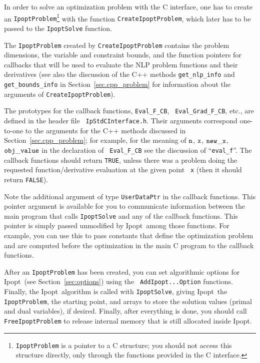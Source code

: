 \documentclass[10pt]{article}
\newcommand{\Ipopt}{{\sc Ipopt}}
\begin{document}
In order to solve an optimization problem with the C interface, one
has to create an {\tt IpoptProblem}\footnote{{\tt IpoptProblem} is a
  pointer to a C structure; you should not access this structure
  directly, only through the functions provided in the C interface.}
with the function {\tt CreateIpoptProblem}, which later has to be
passed to the {\tt IpoptSolve} function.

The {\tt IpoptProblem} created by {\tt CreateIpoptProblem} contains
the problem dimensions, the variable and constraint bounds, and the
function pointers for callbacks that will be used to evaluate the NLP
problem functions and their derivatives (see also the discussion of
the C++ methods {\tt get\_nlp\_info} and {\tt get\_bounds\_info} in
Section~\ref{sec.cpp_problem} for information about the arguments of
{\tt CreateIpoptProblem}).

The prototypes for the callback functions, {\tt Eval\_F\_CB}, {\tt
  Eval\_Grad\_F\_CB}, etc., are defined in the header file {\tt
  IpStdCInterface.h}.  Their arguments correspond one-to-one to the
arguments for the C++ methods discussed in
Section~\ref{sec.cpp_problem}; for example, for the meaning of $\tt
n$, $\tt x$, $\tt new\_x$, $\tt obj\_value$ in the declaration of {\tt
  Eval\_F\_CB} see the discussion of ``{\tt eval\_f}''.  The callback
functions should return {\tt TRUE}, unless there was a problem doing
the requested function/derivative evaluation at the given point {\tt
  x} (then it should return {\tt FALSE}).

Note the additional argument of type {\tt UserDataPtr} in the callback
functions.  This pointer argument is available for you to communicate
information between the main program that calls {\tt IpoptSolve} and
any of the callback functions.  This pointer is simply passed
unmodified by \Ipopt\ among those functions.  For example, you can
use this to pass constants that define the optimization problem and
are computed before the optimization in the main C program to the
callback functions.

After an {\tt IpoptProblem} has been created, you can set algorithmic
options for \Ipopt\ (see Section~\ref{sec:options}) using the {\tt
  AddIpopt...Option} functions.  Finally, the \Ipopt\ algorithm is
called with {\tt IpoptSolve}, giving \Ipopt\ the {\tt IpoptProblem},
the starting point, and arrays to store the solution values (primal
and dual variables), if desired.  Finally, after everything is done,
you should call {\tt FreeIpoptProblem} to release internal memory that
is still allocated inside \Ipopt.
\end{document}
